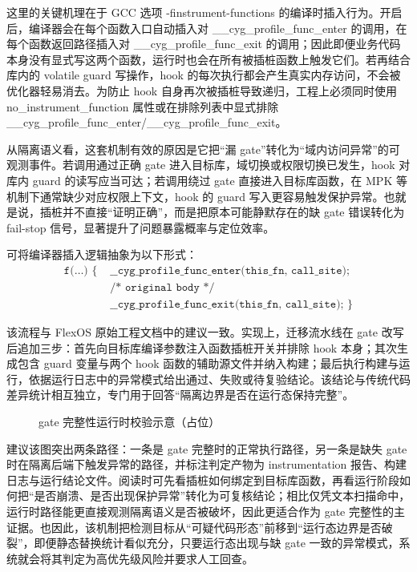 \documentclass[UTF8,a4paper,12pt]{ctexart}
\numberwithin{equation}{section}
\begin{document}
这里的关键机理在于 GCC 选项 -finstrument-functions
的编译时插入行为。开启后，编译器会在每个函数入口自动插入对
\_\_cyg\_profile\_func\_enter 的调用，在每个函数返回路径插入对
\_\_cyg\_profile\_func\_exit
的调用；因此即便业务代码本身没有显式写这两个函数，运行时也会在所有被插桩函数上触发它们。若再结合库内的
volatile guard 写操作，hook
的每次执行都会产生真实内存访问，不会被优化器轻易消去。为防止 hook
自身再次被插桩导致递归，工程上必须同时使用 no\_instrument\_function
属性或在排除列表中显式排除
\_\_cyg\_profile\_func\_enter/\_\_cyg\_profile\_func\_exit。

从隔离语义看，这套机制有效的原因是它把``漏
gate''转化为``域内访问异常''的可观测事件。若调用通过正确 gate
进入目标库，域切换或权限切换已发生，hook 对库内 guard
的读写应当可达；若调用绕过 gate 直接进入目标库函数，在 MPK
等机制下通常缺少对应权限上下文，hook 的 guard
写入更容易触发保护异常。也就是说，插桩并不直接``证明正确''，而是把原本可能静默存在的缺
gate 错误转化为 fail-stop 信号，显著提升了问题暴露概率与定位效率。

可将编译器插入逻辑抽象为以下形式：
\begin{equation}
\begin{aligned}
\texttt{f(\ldots)\ \{\ } & \texttt{\_\_cyg\_profile\_func\_enter(this\_fn, call\_site);}\ \\
& \texttt{/* original body */}\ \\
& \texttt{\_\_cyg\_profile\_func\_exit(this\_fn, call\_site);\ \}}
\end{aligned}
\end{equation}

该流程与 FlexOS 原始工程文档中的建议一致。实现上，迁移流水线在 gate
改写后追加三步：首先向目标库编译参数注入函数插桩开关并排除 hook
本身；其次生成包含 guard 变量与两个 hook
函数的辅助源文件并纳入构建；最后执行构建与运行，依据运行日志中的异常模式给出通过、失败或待复验结论。该结论与传统代码差异统计相互独立，专门用于回答``隔离边界是否在运行态保持完整''。

\begin{figure}[htbp]
  \centering
  \caption{gate 完整性运行时校验示意（占位）}
  \label{fig:gate-runtime-check-placeholder}
\end{figure}

建议该图突出两条路径：一条是 gate 完整时的正常执行路径，另一条是缺失
gate 时在隔离后端下触发异常的路径，并标注判定产物为 instrumentation
报告、构建日志与运行结论文件。阅读时可先看插桩如何绑定到目标库函数，再看运行阶段如何把``是否崩溃、是否出现保护异常''转化为可复核结论；相比仅凭文本扫描命中，运行时路径能更直接观测隔离语义是否被破坏，因此更适合作为 gate 完整性的主证据。也因此，该机制把检测目标从``可疑代码形态''前移到``运行态边界是否破裂''，即便静态替换统计看似充分，只要运行态出现与缺 gate 一致的异常模式，系统就会将其判定为高优先级风险并要求人工回查。
\end{document}
